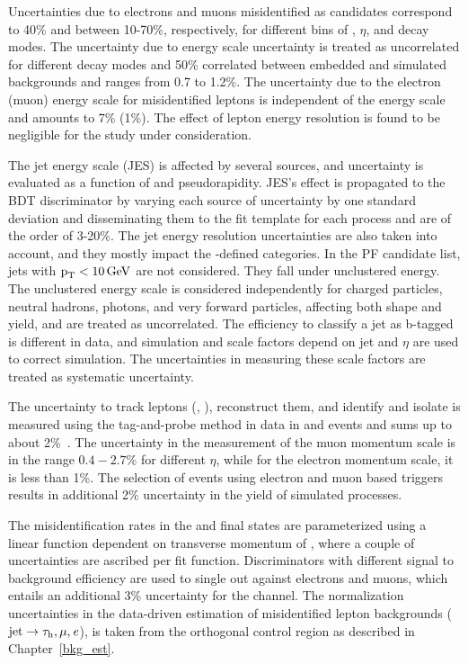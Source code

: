 Uncertainties due to electrons and muons misidentified as \tauh candidates correspond to 40\% and between 10-70\%, respectively, for different bins of \pt, $\eta$, and \tauh decay modes. The uncertainty due to \tauh energy scale uncertainty is treated as uncorrelated for different decay modes and 50\% correlated between embedded and simulated backgrounds and ranges from 0.7 to 1.2\%. The uncertainty due to the electron (muon) energy scale for misidentified leptons is independent of the \tauh energy scale and amounts to 7\% (1\%). The effect of lepton energy resolution is found to be negligible for the study under consideration.

The jet energy scale (JES) is affected by several sources, and uncertainty is evaluated as a function of \pt and pseudorapidity. JES's effect is propagated to the BDT discriminator by varying each source of uncertainty by one standard deviation and disseminating them to the fit template for each process and are of the order of 3-20\%. The jet energy resolution uncertainties are also taken into account, and they mostly impact the \mjj-defined categories. In the PF candidate list, jets with $\text{p}_\text{T} < 10 \,\text{Ge\hspace{-.08em}V}$ are not considered. They fall under unclustered energy. The unclustered energy scale is considered independently for charged particles, neutral hadrons, photons, and very forward particles, affecting both shape and yield, and are treated as uncorrelated. The efficiency to classify a jet as b-tagged is different in data, and simulation and scale factors depend on jet \pt and $\eta$ are used to correct simulation. The uncertainties in measuring these scale factors are treated as systematic uncertainty.

The uncertainty to track leptons (\Pe, \Pgm), reconstruct them, and identify and isolate is measured using the tag-and-probe method in data in \Zee and \Zmm events and sums up to about 2\%~\cite{Chatrchyan:2012xi, Khachatryan:2015hwa, Khachatryan:2015dfa, CMS:2016gvn}. The uncertainty in the measurement of the muon momentum scale is in the range $0.4-2.7\%$ for different $\eta$, while for the electron momentum scale, it is less than 1\%. The selection of events using electron and muon based triggers results in additional 2\% uncertainty in the yield of simulated processes.

The misidentification rates in the  \ehad and \muhad final states are parameterized using a linear function dependent on transverse momentum of \tauh, where a couple of uncertainties are ascribed per fit function. Discriminators with different signal to background efficiency are used to single out \tauh against electrons and muons, which entails an additional 3\% uncertainty for the \ehad channel. The normalization uncertainties in the data-driven estimation of misidentified lepton backgrounds ($\text{jet}\to\tau_{\text{h}}, \mu, \textit{e}$), is taken from the orthogonal control region as described in Chapter~\ref{bkg_est}.

